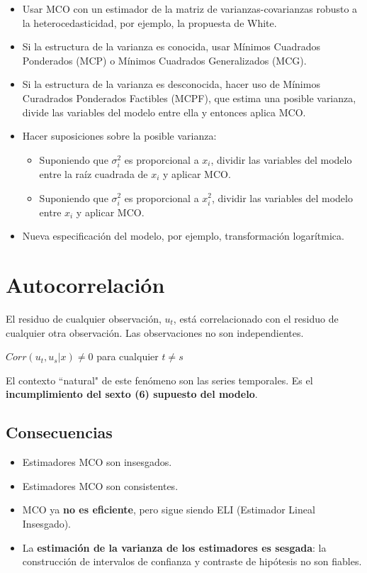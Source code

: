 \documentclass[10pt, a4paper, landscape]{extarticle}
\begin{document}
\begin{multicols}{3}
\begin{itemize}[leftmargin=*]
\item Usar MCO con un estimador de la matriz de varianzas-covarianzas robusto a la heterocedasticidad, por ejemplo, la propuesta de White.
\item Si la estructura de la varianza es conocida, usar Mínimos Cuadrados Ponderados (MCP) o Mínimos Cuadrados Generalizados (MCG).
\item Si la estructura de la varianza es desconocida, hacer uso de Mínimos Curadrados Ponderados Factibles (MCPF), que estima una posible varianza, divide las variables del modelo entre ella y entonces aplica MCO.
\item Hacer suposiciones sobre la posible varianza:
\begin{itemize}[leftmargin=*]
\item Suponiendo que $\sigma_i^2$ es proporcional a $x_i$, dividir las variables del modelo entre la raíz cuadrada de $x_i$ y aplicar MCO.
\item Suponiendo que $\sigma_i^2$ es proporcional a $x_i^2$, dividir las variables del modelo entre $x_i$ y aplicar MCO.
\end{itemize}
\item Nueva especificación del modelo, por ejemplo, transformación logarítmica.
\end{itemize}

\columnbreak

\section*{Autocorrelación}

El residuo de cualquier observación, $u_t$, está correlacionado con el residuo de cualquier otra observación. Las observaciones no son independientes.

\begin{center}
$Corr(u_t, u_s | x) \neq 0$ para cualquier $t \neq s$
\end{center}

El contexto ``natural" de este fenómeno son las series temporales. Es el \textbf{incumplimiento del sexto (6) supuesto del modelo}.

\subsection*{Consecuencias}

\begin{itemize}[leftmargin=*]
\item Estimadores MCO son insesgados.
\item Estimadores MCO son consistentes.
\item MCO ya \textbf{no es eficiente}, pero sigue siendo ELI (Estimador Lineal Insesgado).
\item La \textbf{estimación de la varianza de los estimadores es sesgada}: la construcción de intervalos de confianza y contraste de hipótesis no son fiables.
\end{itemize}


\end{multicols}
\end{document}
